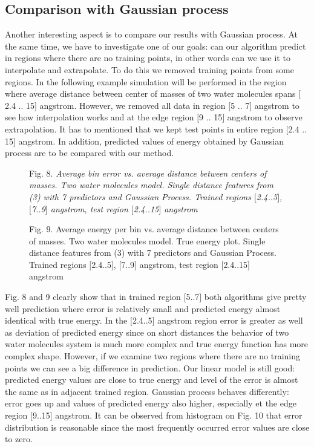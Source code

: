 \documentclass[aps,prl,reprint,amsmath,amssymb,nature]{revtex4-1}
\begin{document}
\subsection{Comparison with Gaussian process}

Another interesting aspect is to compare our results with Gaussian 
process. At the same time, we have to investigate one of our goals: can 
our algorithm predict in regions where there are no training points, in 
other words can we use it to interpolate and extrapolate. To do this we 
removed training points from some regions. In the following example 
simulation will be performed in the region where average distance 
between center of masses of two water molecules spans $[$2.4 .. 15$]$ 
angstrom. However, we removed all data in region $[$5 .. 7$]$ angstrom 
to see how interpolation works and at the edge region $[$9 .. 15$]$ 
angstrom to observe extrapolation. It has to mentioned that we kept test 
points in entire region $[$2.4 .. 15$]$ angstrom. In addition, predicted 
values of energy obtained by Gaussian process are to be compared with 
our method. 

\begin{figure}[h]
\centering
\caption{Fig. 8. \textit{Average bin error vs. average distance between centers 
of masses. Two water molecules model. Single distance features from (3) 
with 7 predictors and Gaussian Process. Trained regions $[$2.4..5$]$, 
$[$7..9$]$ angstrom, test region $[$2.4..15$]$ angstrom}}
\end{figure}

\begin{figure}[h]
\centering
\caption{Fig. 9. Average energy per bin vs. average distance between 
centers of masses. Two water molecules model. True energy plot. Single 
distance features from (3) with 7 predictors and Gaussian Process. 
Trained regions $[$2.4..5$]$, $[$7..9$]$ angstrom, test region 
$[$2.4..15$]$ angstrom}
\end{figure}

Fig. 8 and 9 clearly show that in trained region $[$5..7$]$ both 
algorithms give pretty well prediction where error is relatively small 
and predicted energy almost identical with true energy. In the 
$[$2.4..5$]$ angstrom region error is greater as well as deviation of 
predicted energy since on short distances the behavior of two water 
molecules system is much more complex and true energy function has more 
complex shape. However, if we examine two regions where there are no 
training points we can see a big difference in prediction. Our linear 
model is still good: predicted energy values are close to true energy 
and level of the error is almost the same as in adjacent trained region. 
Gaussian process behaves differently: error goes up and values of 
predicted energy also higher, especially et the edge region $[$9..15$]$ 
angstrom. It can be observed from histogram on Fig. 10 that error 
distribution is reasonable since the most frequently occurred error 
values are close to zero.
\end{document}
